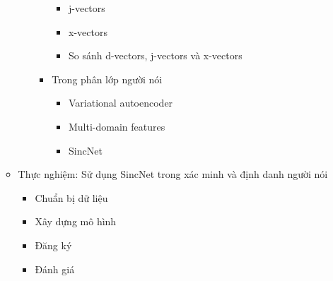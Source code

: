 \documentclass{article}
\begin{document}
\begin{itemize}
\begin{itemize}
\begin{itemize}
\begin{itemize}
\begin{itemize}
						\item j-vectors
						\item x-vectors
						\item So sánh d-vectors, j-vectors và x-vectors
					\end{itemize}
					\item Trong phân lớp người nói
					\begin{itemize}
						\item Variational autoencoder
						\item Multi-domain features
						\item SincNet
					\end{itemize}
				\end{itemize}
			\end{itemize}
			\item Thực nghiệm: Sử dụng SincNet trong xác minh và định danh người nói
			\begin{itemize}
				\item Chuẩn bị dữ liệu
				\item Xây dựng mô hình
				\item Đăng ký
				\item Đánh giá
			\end{itemize}
		\end{itemize}
	\end{itemize}
\end{document}
